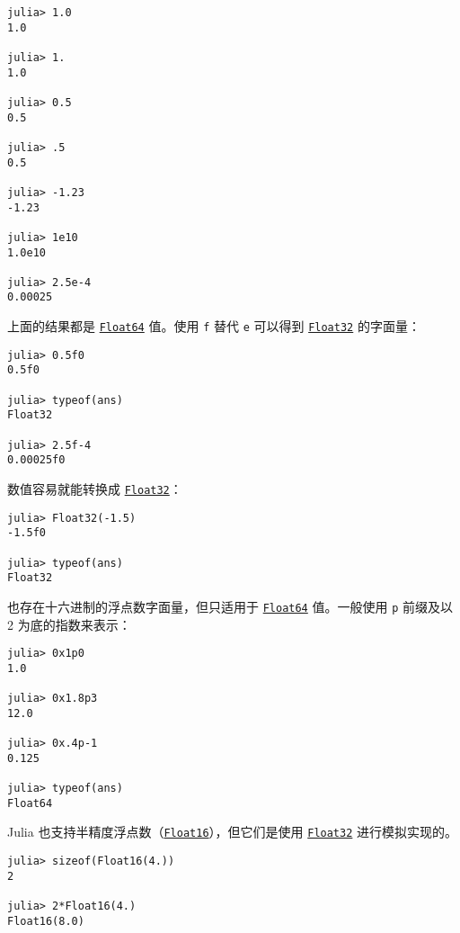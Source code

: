 \begin{verbatim}
julia> 1.0
1.0

julia> 1.
1.0

julia> 0.5
0.5

julia> .5
0.5

julia> -1.23
-1.23

julia> 1e10
1.0e10

julia> 2.5e-4
0.00025
\end{verbatim}



上面的结果都是 \hyperlink{5027751419500983000}{\texttt{Float64}} 值。使用 \texttt{f} 替代 \texttt{e} 可以得到 \hyperlink{8101639384272933082}{\texttt{Float32}} 的字面量：




\begin{verbatim}
julia> 0.5f0
0.5f0

julia> typeof(ans)
Float32

julia> 2.5f-4
0.00025f0
\end{verbatim}



数值容易就能转换成 \hyperlink{8101639384272933082}{\texttt{Float32}}：




\begin{verbatim}
julia> Float32(-1.5)
-1.5f0

julia> typeof(ans)
Float32
\end{verbatim}



也存在十六进制的浮点数字面量，但只适用于 \hyperlink{5027751419500983000}{\texttt{Float64}} 值。一般使用 \texttt{p} 前缀及以 2 为底的指数来表示：




\begin{verbatim}
julia> 0x1p0
1.0

julia> 0x1.8p3
12.0

julia> 0x.4p-1
0.125

julia> typeof(ans)
Float64
\end{verbatim}



Julia 也支持半精度浮点数（\hyperlink{2727296760866702904}{\texttt{Float16}}），但它们是使用 \hyperlink{8101639384272933082}{\texttt{Float32}} 进行模拟实现的。




\begin{verbatim}
julia> sizeof(Float16(4.))
2

julia> 2*Float16(4.)
Float16(8.0)
\end{verbatim}



